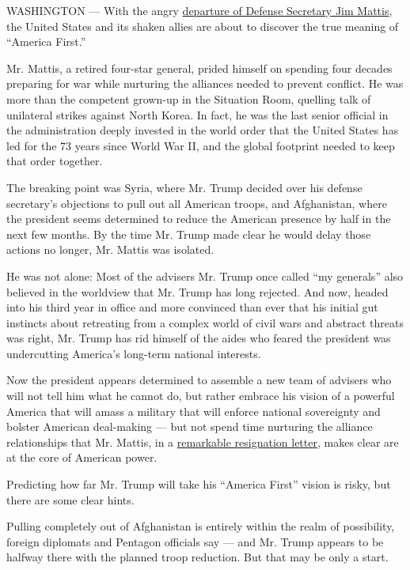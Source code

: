 WASHINGTON --- With the angry
\href{https://www.nytimes.com/2018/12/20/us/politics/jim-mattis-defense-secretary-trump.html?action=click\&module=Spotlight\&pgtype=Homepage}{departure
of Defense Secretary Jim Mattis}, the United States and its shaken
allies are about to discover the true meaning of ``America First.''

Mr. Mattis, a retired four-star general, prided himself on spending four
decades preparing for war while nurturing the alliances needed to
prevent conflict. He was more than the competent grown-up in the
Situation Room, quelling talk of unilateral strikes against North Korea.
In fact, he was the last senior official in the administration deeply
invested in the world order that the United States has led for the 73
years since World War II, and the global footprint needed to keep that
order together.

The breaking point was Syria, where Mr. Trump decided over his defense
secretary's objections to pull out all American troops, and Afghanistan,
where the president seems determined to reduce the American presence by
half in the next few months. By the time Mr. Trump made clear he would
delay those actions no longer, Mr. Mattis was isolated.

He was not alone: Most of the advisers Mr. Trump once called ``my
generals'' also believed in the worldview that Mr. Trump has long
rejected. And now, headed into his third year in office and more
convinced than ever that his initial gut instincts about retreating from
a complex world of civil wars and abstract threats was right, Mr. Trump
has rid himself of the aides who feared the president was undercutting
America's long-term national interests.

Now the president appears determined to assemble a new team of advisers
who will not tell him what he cannot do, but rather embrace his vision
of a powerful America that will amass a military that will enforce
national sovereignty and bolster American deal-making --- but not spend
time nurturing the alliance relationships that Mr. Mattis, in a
\href{https://www.nytimes.com/2018/12/20/us/politics/letter-jim-mattis-trump.html?action=click\&module=Spotlight\&pgtype=Homepage}{remarkable
resignation letter}, makes clear are at the core of American power.

Predicting how far Mr. Trump will take his ``America First'' vision is
risky, but there are some clear hints.

Pulling completely out of Afghanistan is entirely within the realm of
possibility, foreign diplomats and Pentagon officials say --- and Mr.
Trump appears to be halfway there with the planned troop reduction. But
that may be only a start.

